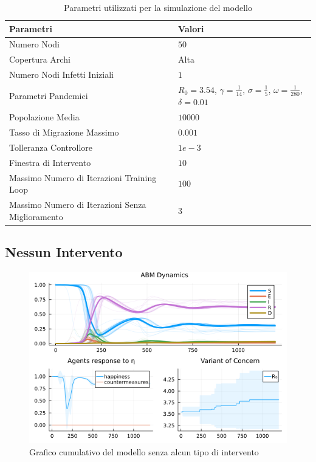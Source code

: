\begin{table}[H]
    \centering
    \caption{Parametri utilizzati per la simulazione del modello}
    \begin{tabular}{ |p{6.5cm}||p{6.5cm}| } 
		\hline
		\textbf{Parametri} & \textbf{Valori} \\ 
		\hline
		Numero Nodi & $50$ \\
		Copertura Archi & Alta \\
		Numero Nodi Infetti Iniziali & $1$ \\
		Parametri Pandemici & $R_0 = 3.54$, $\gamma = \frac{1}{14}$, $\sigma = \frac{1}{5}$, $\omega = \frac{1}{280}$, $\delta = 0.01$ \\
		Popolazione Media & $10000$ \\
		Tasso di Migrazione Massimo & $0.001$ \\
		Tolleranza Controllore & $1e-3$ \\
		Finestra di Intervento & $10$ \\
		Massimo Numero di Iterazioni Training Loop & $100$ \\
		Massimo Numero di Iterazioni Senza Miglioramento & $3$ \\
		\hline
		\end{tabular}
\end{table}

\subsection{Nessun Intervento}

\begin{figure}[H]
    \begin{center}
		\includegraphics[width=\textwidth]{img/SocialNetworkABM_NO_CONTROL.png}
		\caption{Grafico cumulativo del modello senza alcun tipo di intervento}
		\label{fig:abm_no_intervent}
	\end{center}
\end{figure}


